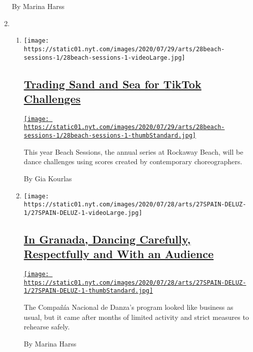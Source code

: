 \begin{enumerate}
  By Marina Harss
\item
  \begin{enumerate}
  \def\labelenumii{\arabic{enumii}.}
  \item
    \texttt{[image: https://static01.nyt.com/images/2020/07/29/arts/28beach-sessions-1/28beach-sessions-1-videoLarge.jpg]}

    \hypertarget{trading-sand-and-sea-for-tiktok-challenges}{%
    \subsection{\texorpdfstring{\href{/2020/07/28/arts/dance/beach-sessions-rockaway-tiktok.html}{Trading
    Sand and Sea for TikTok
    Challenges}}{Trading Sand and Sea for TikTok Challenges}}\label{trading-sand-and-sea-for-tiktok-challenges}}

    \href{/2020/07/28/arts/dance/beach-sessions-rockaway-tiktok.html}{\texttt{[image: https://static01.nyt.com/images/2020/07/29/arts/28beach-sessions-1/28beach-sessions-1-thumbStandard.jpg]}}

    This year Beach Sessions, the annual series at Rockaway Beach, will
    be dance challenges using scores created by contemporary
    choreographers.

    By Gia Kourlas
  \item
    \texttt{[image: https://static01.nyt.com/images/2020/07/28/arts/27SPAIN-DELUZ-1/27SPAIN-DELUZ-1-videoLarge.jpg]}

    \hypertarget{in-granada-dancing-carefully-respectfully-and-with-an-audience}{%
    \subsection{\texorpdfstring{\href{/2020/07/27/arts/dance/granada-festival-compania-nacional-de-danza.html}{In
    Granada, Dancing Carefully, Respectfully and With an
    Audience}}{In Granada, Dancing Carefully, Respectfully and With an Audience}}\label{in-granada-dancing-carefully-respectfully-and-with-an-audience}}

    \href{/2020/07/27/arts/dance/granada-festival-compania-nacional-de-danza.html}{\texttt{[image: https://static01.nyt.com/images/2020/07/28/arts/27SPAIN-DELUZ-1/27SPAIN-DELUZ-1-thumbStandard.jpg]}}

    The Compañía Nacional de Danza's program looked like business as
    usual, but it came after months of limited activity and strict
    measures to rehearse safely.

    By Marina Harss
  \end{enumerate}
\end{enumerate}

